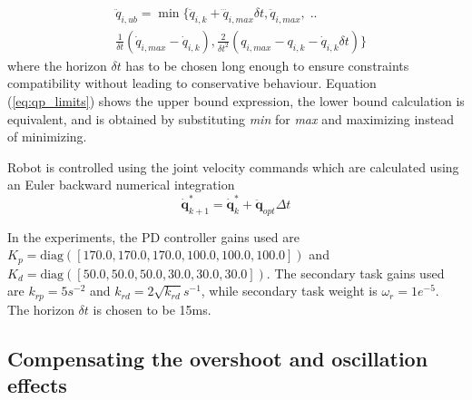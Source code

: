\begin{equation}
\begin{split}
    &\ddot{{q}}_{i,ub} = \min  \Big\{ \ddot{{q}}_{i,k} + \dddot{q}_{i,max}\delta t, 
    \ddot{{q}}_{i,max}, \; ..\\
    &\frac{1}{\delta  t}(\dot{{q}}_{i,max} - \dot{{q}}_{i,k}),  
    \frac{2}{\delta  t^2}({{q}}_{i,max} - {{q}}_{i,k} - \dot{{q}}_{i,k}\delta  t )\Big\}  
\end{split}\label{eq:qp_limits}
\end{equation}
where the horizon $\delta t$ has to be chosen long enough to ensure constraints compatibility without leading to conservative behaviour\cite{Prete2018}. Equation (\ref{eq:qp_limits}) shows the upper bound expression, the lower bound calculation is equivalent, and is obtained by substituting \textit{min} for \textit{max} and maximizing instead of minimizing.

Robot is controlled using the joint velocity commands which are calculated using an Euler backward numerical integration
\begin{equation}
\dot{\bm{q}}^*_{k+1} = \dot{\bm{q}}^*_{k} +  \ddot{\bm{q}}_{opt}\Delta t  
\end{equation}

In the experiments, the PD controller gains used are $K_p=\text{diag}([170.0, 170.0, 170.0, 100.0, 100.0, 100.0])$ and $K_d=\text{diag}([50.0, 50.0, 50.0, 30.0, 30.0, 30.0])$. The secondary task gains used are $k_{rp}=5 s^{-2}$ and $k_{rd}=2\sqrt{k_{rd}}s^{-1}$, while secondary task weight is $\omega_r=1e^{-5}$. The horizon $\delta t$ is chosen to be 15ms. 


\subsection{Compensating the overshoot and oscillation effects}

